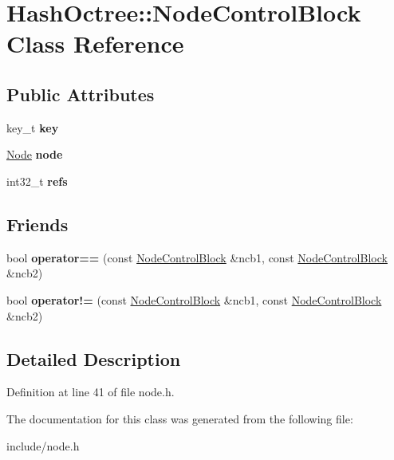\hypertarget{class_hash_octree_1_1_node_control_block}{}\section{Hash\+Octree\+::Node\+Control\+Block Class Reference}
\label{class_hash_octree_1_1_node_control_block}
\subsection*{Public Attributes}
\begin{DoxyCompactItemize}
\item 
\mbox{\label{class_hash_octree_1_1_node_control_block_a672e42c926a52f257d172201e6862e6d}} 
key\+\_\+t {\bfseries key}
\item 
\mbox{\label{class_hash_octree_1_1_node_control_block_a7d4e7be614eeadbbcd76f8b2a825b53c}} 
\mbox{\hyperlink{class_hash_octree_1_1_node}{Node}} {\bfseries node}
\item 
\mbox{\label{class_hash_octree_1_1_node_control_block_afac8e319ef3207191af4a531f00f9e91}} 
int32\+\_\+t {\bfseries refs}
\end{DoxyCompactItemize}
\subsection*{Friends}
\begin{DoxyCompactItemize}
\item 
\mbox{\label{class_hash_octree_1_1_node_control_block_ac028e64e0dde0367c933bb709bb87ec3}} 
bool {\bfseries operator==} (const \mbox{\hyperlink{class_hash_octree_1_1_node_control_block}{Node\+Control\+Block}} \&ncb1, const \mbox{\hyperlink{class_hash_octree_1_1_node_control_block}{Node\+Control\+Block}} \&ncb2)
\item 
\mbox{\label{class_hash_octree_1_1_node_control_block_aa2338796b0390932a5ba5f779dc58742}} 
bool {\bfseries operator!=} (const \mbox{\hyperlink{class_hash_octree_1_1_node_control_block}{Node\+Control\+Block}} \&ncb1, const \mbox{\hyperlink{class_hash_octree_1_1_node_control_block}{Node\+Control\+Block}} \&ncb2)
\end{DoxyCompactItemize}


\subsection{Detailed Description}


Definition at line 41 of file node.\+h.



The documentation for this class was generated from the following file\+:\begin{DoxyCompactItemize}
\item 
include/node.\+h\end{DoxyCompactItemize}
